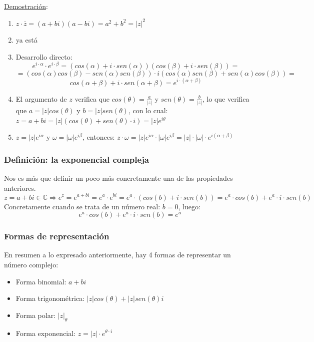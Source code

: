 \documentclass[10pt,a4paper,openright]{book}
\begin{document}
\underline{Demostración}:
\begin{enumerate}
\item $z\cdot \bar{z}=(a+bi)(a-bi)=a^2+b^2=|z|^2$
\item ya está
\item Desarrollo directo:
$$e^{i\cdot \alpha}\cdot e^{i\cdot \beta}=\left( cos(\alpha)+i\cdot sen(\alpha)\right) \left( cos(\beta)+ i\cdot sen(\beta)\right)=$$
$$=\left( cos(\alpha)cos(\beta)-sen(\alpha)sen(\beta)\right)\cdot i\left( cos(\alpha)sen(\beta)+sen(\alpha)cos(\beta)\right)=$$
$$cos(\alpha + \beta)+ i\cdot sen(\alpha + \beta)= e^{i\cdot(\alpha + \beta)}$$

\item El argumento de $z$ verifica que $cos(\theta)=\frac{a}{|z|}$ y $sen(\theta)=\frac{b}{|z|}$, lo que verifica que $a=|z|cos(\theta)$ y $b=|z|sen(\theta)$, con lo cual: $z=a+bi=|z|(cos(\theta)+sen(\theta)\cdot i)=|z|e^{i\theta}$

\item $z=|z|e^{i\alpha}$ y $\omega=|\omega|e^{i\beta}$, entonces: $z\cdot \omega=|z|e^{i\alpha}\cdot |\omega|e^{i\beta}=|z|\cdot |\omega|\cdot e^{i(\alpha +\beta)}$
\end{enumerate}

\subsubsection*{Definición: la exponencial compleja}
Nos es más que definir un poco más concretamente una de las propiedades anteriores.
$$z=a+bi\in \mathbb C\Rightarrow e^z=e^{a+bi}=e^a\cdot e^{bi}=e^a\cdot (cos(b)+i\cdot sen(b))=e^a\cdot cos(b)+e^a\cdot i\cdot sen(b)$$
Concretamente cuando se trata de un número real: $b=0$, luego:
$$e^a\cdot cos(b)+e^a\cdot i\cdot sen(b)=e^a$$

\subsubsection*{Formas de representación}
En resumen a lo expresado anteriormente, hay 4 formas de representar un número complejo:
\begin{itemize}
\item Forma binomial: $a+bi$
\item Forma trigonométrica: $|z|cos(\theta)+ |z|sen(\theta)i$
\item Forma polar: $|z|_\theta$
\item Forma exponencial: $z=|z|\cdot e^{\theta\cdot i}$
\end{itemize}
\end{document}

